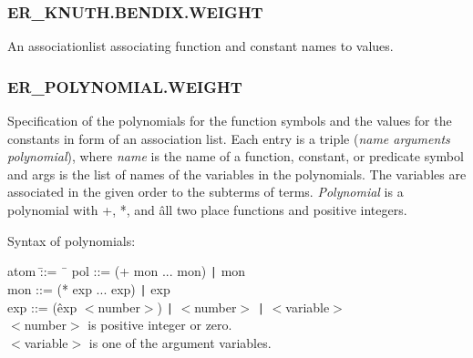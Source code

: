 \subsubsection{ER\_KNUTH.BENDIX.WEIGHT}
  

  An associationlist associating function and constant names to
values.

\PO


\subsubsection{ER\_POLYNOMIAL.WEIGHT}
  

  Specification of the polynomials for the function symbols and the
values for the constants in form of an association list.
Each entry is a triple ({\em name arguments polynomial\/}), where {\em
name\/} is the name of a function, constant, or predicate symbol and args
is the list of names of the variables in the polynomials.  The
variables are associated in the given order to the subterms of terms.
{\em Polynomial\/} is a polynomial with +, *, and \^ all two place functions
and positive integers.

Syntax of polynomials:

\begin{tabbing}		
atom \quad \= ::= \quad \= \ \kill		    
pol \> ::= \> (+ mon ... mon) {\tt |} mon\\
mon \> ::= \> (* exp ... exp) {\tt |} exp\\
exp \> ::= \> (\^ exp $<$number$>$) {\tt |} $<$number$>$ {\tt |} $<$variable$>$\\
$<$number$>$ \>\> is positive integer or zero.\\
$<$variable$>$ \>\> is one of the argument variables.
\end{tabbing}

 
\PO
{}


